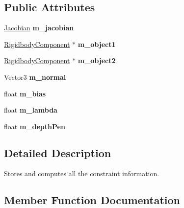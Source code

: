 \subsection*{Public Attributes}
\begin{DoxyCompactItemize}
\item 
\mbox{\label{classConstraint_a81be9de1b027d83afc88075cac8b5b4b}} 
\hyperlink{classJacobian}{Jacobian} {\bfseries m\+\_\+jacobian}
\item 
\mbox{\label{classConstraint_a9bbea2866cb6f593f7be5422357ef43f}} 
\hyperlink{classRigidbodyComponent}{Rigidbody\+Component} $\ast$ {\bfseries m\+\_\+object1}
\item 
\mbox{\label{classConstraint_a927b633621d426d3d049fe9e44b8bae1}} 
\hyperlink{classRigidbodyComponent}{Rigidbody\+Component} $\ast$ {\bfseries m\+\_\+object2}
\item 
\mbox{\label{classConstraint_aaabf19e98bae7a66b87d8a726316b20a}} 
Vector3 {\bfseries m\+\_\+normal}
\item 
\mbox{\label{classConstraint_a4f7dae1972c717b15fa22a255bcb12f6}} 
float {\bfseries m\+\_\+bias}
\item 
\mbox{\label{classConstraint_a4e856baff516350a810ea3bf0a840450}} 
float {\bfseries m\+\_\+lambda}
\item 
\mbox{\label{classConstraint_ac3fdb5d9607837f03830b1874649a1cf}} 
float {\bfseries m\+\_\+depth\+Pen}
\end{DoxyCompactItemize}


\subsection{Detailed Description}
Stores and computes all the constraint information. 

\subsection{Member Function Documentation}
\mbox{\label{classConstraint_ad59276ed90da13e5169f411a0b51329d}} 
